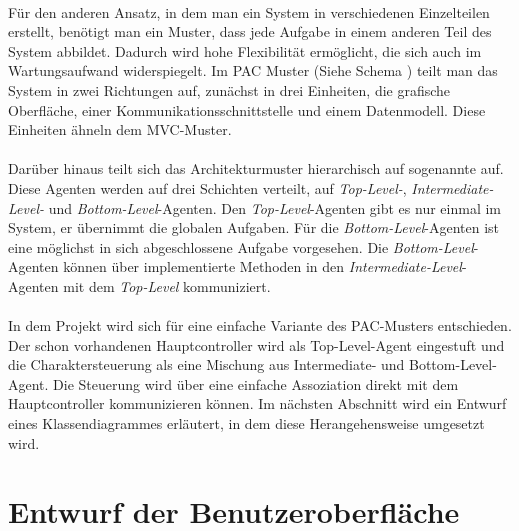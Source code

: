 \paragraph{}
Für den anderen Ansatz, in dem man ein System in verschiedenen Einzelteilen erstellt, benötigt man ein Muster, dass jede Aufgabe in einem anderen Teil des System abbildet. Dadurch wird hohe Flexibilität ermöglicht, die sich auch im Wartungsaufwand widerspiegelt.
Im PAC Muster (Siehe Schema ) teilt man das System in zwei Richtungen auf, zunächst in drei Einheiten, die grafische Oberfläche, einer Kommunikationsschnittstelle und einem Datenmodell. Diese Einheiten ähneln dem MVC-Muster.
\paragraph{}
Darüber hinaus teilt sich das Architekturmuster hierarchisch auf sogenannte  auf.
Diese Agenten werden auf drei Schichten verteilt, auf \textit{Top-Level-}, \textit{Intermediate-Level-} und \textit{Bottom-Level}-Agenten. Den \textit{Top-Level}-Agenten gibt es nur einmal im System, er übernimmt die globalen Aufgaben. Für die \textit{Bottom-Level}-Agenten ist eine möglichst in sich abgeschlossene Aufgabe vorgesehen. Die \textit{Bottom-Level}-Agenten können über implementierte Methoden in den \textit{Intermediate-Level}-Agenten mit dem \textit{Top-Level} kommuniziert.
\paragraph{}
In dem Projekt wird sich für eine einfache Variante des PAC-Musters entschieden. Der schon vorhandenen Hauptcontroller wird als Top-Level-Agent eingestuft und die Charaktersteuerung als eine Mischung aus Intermediate- und Bottom-Level-Agent. Die Steuerung wird über eine einfache Assoziation direkt mit dem Hauptcontroller kommunizieren können. Im nächsten Abschnitt wird ein Entwurf eines Klassendiagrammes erläutert, in dem diese Herangehensweise umgesetzt wird.

\section{Entwurf der Benutzeroberfläche}
